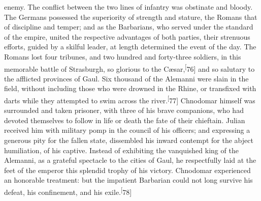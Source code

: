 enemy. The conflict between the two lines of infantry was
obstinate and bloody. The Germans possessed the superiority of
strength and stature, the Romans that of discipline and temper;
and as the Barbarians, who served under the standard of the
empire, united the respective advantages of both parties, their
strenuous efforts, guided by a skilful leader, at length
determined the event of the day. The Romans lost four tribunes,
and two hundred and forty-three soldiers, in this memorable
battle of Strasburgh, so glorious to the Cæsar,\textsuperscript[76] and so
salutary to the afflicted provinces of Gaul. Six thousand of the
Alemanni were slain in the field, without including those who
were drowned in the Rhine, or transfixed with darts while they
attempted to swim across the river.\textsuperscript[77] Chnodomar himself was
surrounded and taken prisoner, with three of his brave
companions, who had devoted themselves to follow in life or death
the fate of their chieftain. Julian received him with military
pomp in the council of his officers; and expressing a generous
pity for the fallen state, dissembled his inward contempt for the
abject humiliation, of his captive. Instead of exhibiting the
vanquished king of the Alemanni, as a grateful spectacle to the
cities of Gaul, he respectfully laid at the feet of the emperor
this splendid trophy of his victory. Chnodomar experienced an
honorable treatment: but the impatient Barbarian could not long
survive his defeat, his confinement, and his exile.\textsuperscript[78]




